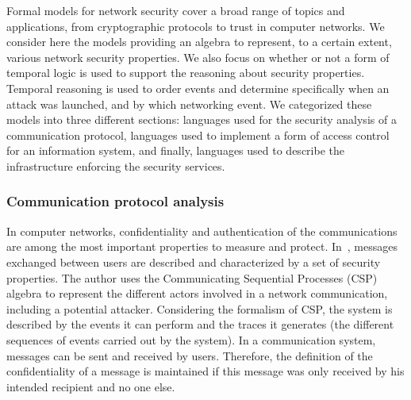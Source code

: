Formal models for network security cover a broad range of topics and applications, from cryptographic protocols to trust in computer networks.
We consider here the models providing an algebra to represent, to a certain extent, various network security properties. 
We also focus on whether or not a form of temporal logic is used to support the reasoning about security properties.
Temporal reasoning is used to order events and determine specifically when an attack was launched, and by which networking event. 
We categorized these models into three different sections: languages used for the security analysis of a communication protocol, languages used to implement a form of access control for an information system, and finally, languages used to describe the infrastructure enforcing the security services.

\subsubsection{Communication protocol analysis}
In computer networks, confidentiality and authentication of the communications are among the most important properties to measure and protect.
In~\cite{CSP-Schneider1996}, messages exchanged between users are described and characterized by a set of security properties.
The author uses the Communicating Sequential Processes (CSP) algebra to represent the different actors involved in a network communication, including a potential attacker. 
Considering the formalism of CSP, the system is described by the events it can perform and the traces it generates (\ie the different sequences of events carried out by the system).
In a communication system, messages can be sent and received by users.
Therefore, the definition of the confidentiality of a message is maintained if this message was only received by his intended recipient and no one else.


